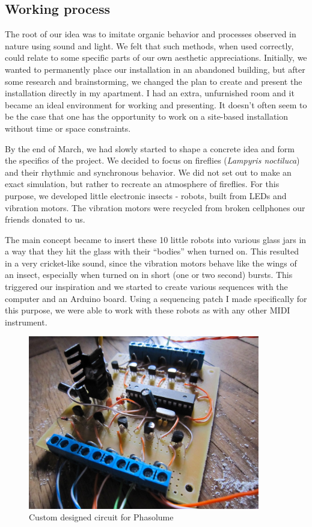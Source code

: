 \documentclass[12pt,a4paper,oneside]{report}
\begin{document}
\subsection{Working process} 

The root of our idea was to imitate organic behavior and processes observed in nature using sound and light.  We felt that such methods, when used correctly, could relate to some specific parts of our own aesthetic appreciations. Initially, we wanted to permanently place our installation in an abandoned building, but after some research and brainstorming, we changed the plan to create and present the installation directly in my apartment. I had an extra, unfurnished room and it became an ideal environment for working and presenting.  It doesn't often seem to be the case that one has the opportunity to work on a site-based installation without time or space constraints.

By the end of March, we had slowly started to shape a concrete idea and form the specifics of the project. We decided to focus on fireflies (\emph{Lampyris noctiluca}) and their rhythmic and synchronous behavior. We did not set out to make an exact simulation, but rather to recreate an atmosphere of fireflies.  For this purpose, we developed little electronic insects - robots, built from LEDs and vibration motors. The vibration motors were recycled from broken cellphones our friends donated to us.

The main concept became to insert these 10 little robots into various glass jars in a way that they hit the glass with their ``bodies'' when turned on. This resulted in a very cricket-like sound, since the vibration motors behave like the wings of an insect, especially when turned on in short (one or two second) bursts. This triggered our inspiration and we started to create various sequences with the computer and an Arduino board. Using a sequencing patch I made specifically for this purpose, we were able to work with these robots as with any other MIDI instrument.

\begin{figure}  
  \centering
    \includegraphics[width=0.9\textwidth]{img/phasolume}
        \caption{Custom designed circuit for Phasolume}
        \label{fig:phasolume}
\end{figure}
\end{document}
